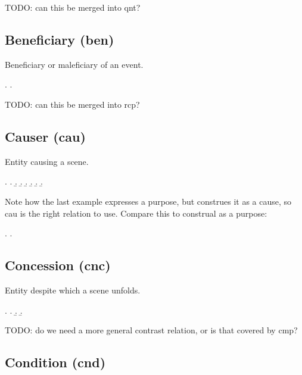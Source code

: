 \documentclass[a4paper]{article}
\begin{document}
TODO: can this be merged into qnt?

\clearpage
\subsection{Beneficiary (\textsf{ben})}
\label{sec:ben}

Beneficiary or maleficiary of an event.

\ex.
\a. 

TODO: can this be merged into rcp?

\clearpage
\subsection{Causer (\textsf{cau})}
\label{sec:cau}

Entity causing a scene.

\ex.
\a. 
\b. 
\b. 
\b. 
\b. 
\b. 
\b. 

Note how the last example expresses a purpose, but construes it as a cause, so
\textsf{cau} is the right relation to use. Compare this to construal as a
purpose:

\ex.
\a. 

\clearpage
\subsection{Concession (\textsf{cnc})}
\label{sec:cnc}

Entity despite which a scene unfolds.

\ex.
\a. 
\b. 
\b. 

TODO: do we need a more general contrast relation, or is that covered by cmp?

\clearpage
\subsection{Condition (\textsf{cnd})}
\label{sec:cnd}
\end{document}
